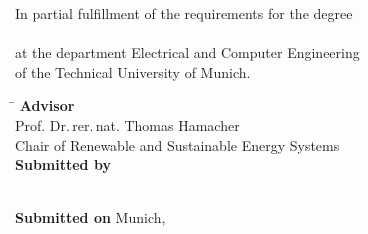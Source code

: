 

\begin{titlingpage}

\noindent
\hfill
\resizebox{!}{1cm}{\TUMlogo}
\vspace{3cm}

\noindent
\large \thesistype
\vspace{.5cm}

\noindent \bfseries \LARGE
\MyTitle


\vspace{5cm}

\noindent \large 
In partial fulfillment of the requirements for the degree\\
\degree\\
at the department Electrical and Computer Engineering\\
of the Technical University of Munich.
\vspace{3cm}





\mdseries

\noindent
\normalsize

\noindent
\begin{tabbing}
\hspace{4cm}\=\kill
\textbf{Advisor} \> \advisor\\[.1cm]
	\> Prof.  Dr.\,rer.\,nat. Thomas Hamacher\\[.1cm]
	\> Chair of Renewable and Sustainable Energy Systems\\[0.25cm] 
\textbf{Submitted by} \> \MyAuthor\\ [.1cm]
 \> \address\\[.1cm]
 \> \telephone\\[0.25cm] 
\textbf{Submitted on} \> Munich, \dateosub
\end{tabbing} 




\end{titlingpage}
